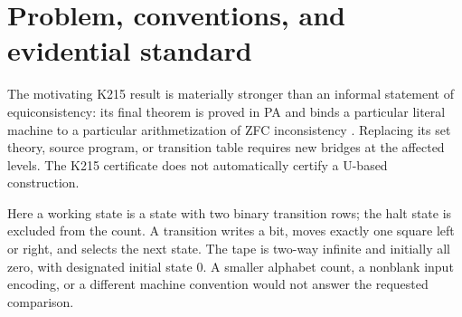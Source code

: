 \documentclass[11pt,a4paper]{article}
\newcommand{\PA}{\mathsf{PA}}
\newcommand{\Con}{\operatorname{Con}}
\newcommand{\Halt}{\operatorname{Halt}}
\newcommand{\IR}{\mathsf{IR}}
\begin{document}
\begin{abstract}
The requested endpoint is a two-symbol, one-tape machine $M$ with fewer than
208 working states such that
$\PA\vdash\neg\Halt(M,\mathrm{blank})\leftrightarrow\Con(\PA)$.
Five incoming U208 archives were examined at the same pinned repository
revision. Their nine primary and alternative tables fall into exactly two
rooted, action-preserving isomorphism classes. All five proposals implement
the same local identification of historical states 172 and 211; their
advertised savings cannot be added. Fresh verification covers 5,084 symbolic
primitive contracts and every literal transition row for each graph class.
The inherited consistency calibration was audited, including the difference
between unary Theory U, the native $W+\IR$ calculus, and the separate positive
theorem-stream proposal. New research includes a more general source
associativity theorem, finite-window inductive context analysis, a direct
18-primitive negation constructor, fixed-role cover emitters, and a proof
compiler with unnecessary successful-modus-ponens padding removed.
Four new local constructions also yield eighteen pairwise non-isomorphic
208-state machines with short halting-equivalence proofs.
None has yet yielded a verified sub-208 literal table. The negative results
are explicitly limited to their search families; they are not state-count
lower bounds.
\end{abstract}
\tableofcontents\newpage

\section{Problem, conventions, and evidential standard}

The motivating K215 result is materially stronger than an informal statement
of equiconsistency: its final theorem is proved in PA and binds a particular
literal machine to a particular arithmetization of ZFC inconsistency
\cite{k215pa}. Replacing its set theory, source program, or transition table
requires new bridges at the affected levels. The K215 certificate does not
automatically certify a U-based construction.

Here a working state is a state with two binary transition rows; the halt
state is excluded from the count. A transition writes a bit, moves exactly
one square left or right, and selects the next state. The tape is two-way
infinite and initially all zero, with designated initial state 0. A smaller
alphabet count, a nonblank input encoding, or a different machine convention
would not answer the requested comparison.
\end{document}
